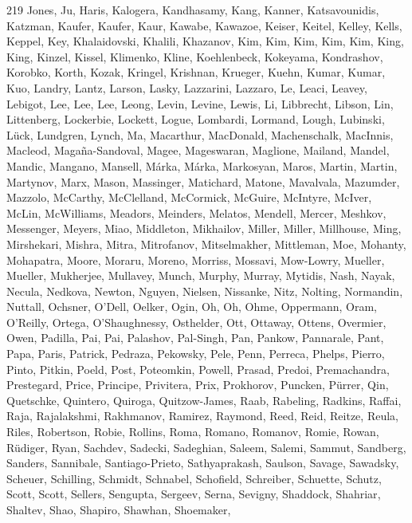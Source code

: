 \documentclass{aa}
\begin{document}
\begin{thebibliography}{219}
{		{Jones}, {Ju}, {Haris}, {Kalogera}, {Kandhasamy}, {Kang}, {Kanner}, {Katsavounidis}, {Katzman}, {Kaufer}, {Kaufer}, {Kaur}, {Kawabe}, {Kawazoe}, {Keiser}, {Keitel}, {Kelley}, {Kells}, {Keppel}, {Key}, {Khalaidovski}, {Khalili}, {Khazanov}, {Kim}, {Kim}, {Kim}, {Kim}, {Kim}, {King}, {King}, {Kinzel}, {Kissel}, {Klimenko}, {Kline}, {Koehlenbeck}, {Kokeyama}, {Kondrashov}, {Korobko}, {Korth}, {Kozak}, {Kringel}, {Krishnan}, {Krueger}, {Kuehn}, {Kumar}, {Kumar}, {Kuo}, {Landry}, {Lantz}, {Larson}, {Lasky}, {Lazzarini}, {Lazzaro}, {Le}, {Leaci}, {Leavey}, {Lebigot}, {Lee}, {Lee}, {Lee}, {Leong}, {Levin}, {Levine}, {Lewis}, {Li}, {Libbrecht}, {Libson}, {Lin}, {Littenberg}, {Lockerbie}, {Lockett}, {Logue}, {Lombardi}, {Lormand}, {Lough}, {Lubinski}, {L{\"u}ck}, {Lundgren}, {Lynch}, {Ma}, {Macarthur}, {MacDonald}, {Machenschalk}, {MacInnis}, {Macleod}, {Maga{\~n}a-Sandoval}, {Magee}, {Mageswaran}, {Maglione}, {Mailand}, {Mandel}, {Mandic}, {Mangano}, {Mansell}, {M{\'a}rka}, {M{\'a}rka}, {Markosyan}, {Maros},
		{Martin}, {Martin}, {Martynov}, {Marx}, {Mason}, {Massinger}, {Matichard}, {Matone}, {Mavalvala}, {Mazumder}, {Mazzolo}, {McCarthy}, {McClelland}, {McCormick}, {McGuire}, {McIntyre}, {McIver}, {McLin}, {McWilliams}, {Meadors}, {Meinders}, {Melatos}, {Mendell}, {Mercer}, {Meshkov}, {Messenger}, {Meyers}, {Miao}, {Middleton}, {Mikhailov}, {Miller}, {Miller}, {Millhouse}, {Ming}, {Mirshekari}, {Mishra}, {Mitra}, {Mitrofanov}, {Mitselmakher}, {Mittleman}, {Moe}, {Mohanty}, {Mohapatra}, {Moore}, {Moraru}, {Moreno}, {Morriss}, {Mossavi}, {Mow-Lowry}, {Mueller}, {Mueller}, {Mukherjee}, {Mullavey}, {Munch}, {Murphy}, {Murray}, {Mytidis}, {Nash}, {Nayak}, {Necula}, {Nedkova}, {Newton}, {Nguyen}, {Nielsen}, {Nissanke}, {Nitz}, {Nolting}, {Normandin}, {Nuttall}, {Ochsner}, {O'Dell}, {Oelker}, {Ogin}, {Oh}, {Oh}, {Ohme}, {Oppermann}, {Oram}, {O'Reilly}, {Ortega}, {O'Shaughnessy}, {Osthelder}, {Ott}, {Ottaway}, {Ottens}, {Overmier}, {Owen}, {Padilla}, {Pai}, {Pai}, {Palashov}, {Pal-Singh}, {Pan}, {Pankow}, {Pannarale},
		{Pant}, {Papa}, {Paris}, {Patrick}, {Pedraza}, {Pekowsky}, {Pele}, {Penn}, {Perreca}, {Phelps}, {Pierro}, {Pinto}, {Pitkin}, {Poeld}, {Post}, {Poteomkin}, {Powell}, {Prasad}, {Predoi}, {Premachandra}, {Prestegard}, {Price}, {Principe}, {Privitera}, {Prix}, {Prokhorov}, {Puncken}, {P{\"u}rrer}, {Qin}, {Quetschke}, {Quintero}, {Quiroga}, {Quitzow-James}, {Raab}, {Rabeling}, {Radkins}, {Raffai}, {Raja}, {Rajalakshmi}, {Rakhmanov}, {Ramirez}, {Raymond}, {Reed}, {Reid}, {Reitze}, {Reula}, {Riles}, {Robertson}, {Robie}, {Rollins}, {Roma}, {Romano}, {Romanov}, {Romie}, {Rowan}, {R{\"u}diger}, {Ryan}, {Sachdev}, {Sadecki}, {Sadeghian}, {Saleem}, {Salemi}, {Sammut}, {Sandberg}, {Sanders}, {Sannibale}, {Santiago-Prieto}, {Sathyaprakash}, {Saulson}, {Savage}, {Sawadsky}, {Scheuer}, {Schilling}, {Schmidt}, {Schnabel}, {Schofield}, {Schreiber}, {Schuette}, {Schutz}, {Scott}, {Scott}, {Sellers}, {Sengupta}, {Sergeev}, {Serna}, {Sevigny}, {Shaddock}, {Shahriar}, {Shaltev}, {Shao}, {Shapiro}, {Shawhan}, {Shoemaker},
}
\end{thebibliography}
\end{document}
